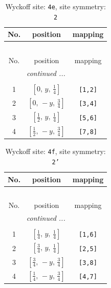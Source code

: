 \documentclass[fleqn,8pt]{jsarticle}
\begin{document}
\renewcommand{\arraystretch}{1.2}
\begin{longtable}{ccc}
\caption{Wyckoff site: {\tt 4e}, site symmetry: {\tt 2}}
 \\
 \hline \hline
No. & position & mapping \\ \hline \endfirsthead

\multicolumn{2}{l}{\tablename\ \thetable{}} \\
 \hline \hline
No. & position & mapping \\ \hline \endhead

 \hline \hline
\multicolumn{2}{r}{\footnotesize\it continued ...} \\ \endfoot

 \hline \hline
\multicolumn{2}{r}{} \\ \endlastfoot

1 & $\left[ 0,\, y,\, \frac{1}{4} \right]$ & {\tt [1,2]} \\ \hline
2 & $\left[ 0,\, - y,\, \frac{3}{4} \right]$ & {\tt [3,4]} \\ \hline
3 & $\left[ \frac{1}{2},\, y,\, \frac{1}{4} \right]$ & {\tt [5,6]} \\ \hline
4 & $\left[ \frac{1}{2},\, - y,\, \frac{3}{4} \right]$ & {\tt [7,8]} \\
\end{longtable}
\renewcommand{\arraystretch}{1.2}
\begin{longtable}{ccc}
\caption{Wyckoff site: {\tt 4f}, site symmetry: {\tt 2'}}
 \\
 \hline \hline
No. & position & mapping \\ \hline \endfirsthead

\multicolumn{2}{l}{\tablename\ \thetable{}} \\
 \hline \hline
No. & position & mapping \\ \hline \endhead

 \hline \hline
\multicolumn{2}{r}{\footnotesize\it continued ...} \\ \endfoot

 \hline \hline
\multicolumn{2}{r}{} \\ \endlastfoot

1 & $\left[ \frac{1}{4},\, y,\, \frac{1}{4} \right]$ & {\tt [1,6]} \\ \hline
2 & $\left[ \frac{3}{4},\, y,\, \frac{1}{4} \right]$ & {\tt [2,5]} \\ \hline
3 & $\left[ \frac{3}{4},\, - y,\, \frac{3}{4} \right]$ & {\tt [3,8]} \\ \hline
4 & $\left[ \frac{1}{4},\, - y,\, \frac{3}{4} \right]$ & {\tt [4,7]} \\
\end{longtable}
\end{document}
